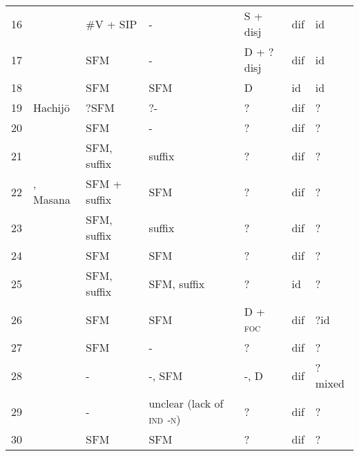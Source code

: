 \begin{tabularx}{\textwidth}{rQQQQQQ}
16 &  & \#V + SIP & {}- & S + disj & dif & id\\
17 &  & SFM & {}- & D + ?disj & dif & id\\
18 &  & SFM & SFM & D & id & id\\
19 & Hachij\=o & ?SFM & ?- & ? & dif & ?\\
20 &  & SFM & {}- & ? & dif & ?\\
21 &  & SFM, suffix & suffix & ? & dif & ?\\
22 & , Masana & SFM + suffix & SFM & ? & dif & ?\\
23 &  & SFM, suffix & suffix & ? & dif & ?\\
24 &  & SFM & SFM & ? & dif & ?\\
25 &  & SFM, suffix & SFM, suffix & ? & id & ?\\
26 &  & SFM & SFM & D + \textsc{foc} & dif & ?id\\
27 &  & SFM & {}- & ? & dif & ?\\
28 &  & {}- & \textsc{{}-,} SFM & {}-, D & dif & ?mixed\\
29 &  & {}- & unclear (lack of \textsc{ind} \textit{{}-}\textsc{n}) & ? & dif & ?\\
30 &  & SFM & SFM & ? & dif & ?\\
\end{tabularx}

